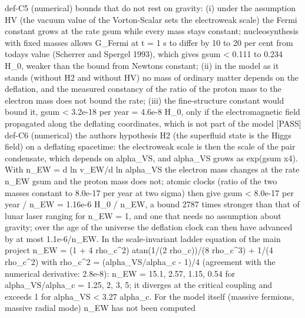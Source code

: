 \documentclass[
  10pt,
]{article}
\newenvironment{Shaded}{}{}
\newcommand{\NormalTok}[1]{#1}
\begin{document}
\begin{Shaded}
\begin{Highlighting}[]
\NormalTok{[PASS] def{-}C5  (numerical) bounds that do not rest on gravity: (i) under the assumption HV (the vacuum value of the Vorton{-}Scalar sets the electroweak scale) the Fermi constant grows at the rate gsum while every mass stays constant; nucleosynthesis with fixed masses allows G\_Fermi at t = 1 s to differ by 10 to 20 per cent from today\textquotesingle{}s value (Scherrer and Spergel 1993), which gives gsum \textless{} 0.111 to 0.234 H\_0, weaker than the bound from Newton\textquotesingle{}s constant; (ii) in the model as it stands (without H2 and without HV) no mass of ordinary matter depends on the deflation, and the measured constancy of the ratio of the proton mass to the electron mass does not bound the rate; (iii) the fine{-}structure constant would bound it, gsum \textless{} 3.2e{-}18 per year = 4.6e{-}8 H\_0, only if the electromagnetic field propagated along the deflating coordinates, which is not part of the model}
\NormalTok{[PASS] def{-}C6  (numerical) the author\textquotesingle{}s hypothesis H2 (the superfluid state is the Higgs field) on a deflating spacetime: the electroweak scale is then the scale of the pair condensate, which depends on alpha\_VS, and alpha\_VS grows as exp(gsum x4). With n\_EW = d ln v\_EW/d ln alpha\_VS the electron mass changes at the rate n\_EW gsum and the proton mass does not; atomic clocks (ratio of the two masses constant to 8.0e{-}17 per year at two sigma) then give gsum \textless{} 8.0e{-}17 per year / n\_EW = 1.16e{-}6 H\_0 / n\_EW, a bound 2787 times stronger than that of lunar laser ranging for n\_EW = 1, and one that needs no assumption about gravity; over the age of the universe the deflation clock can then have advanced by at most 1.1e{-}6/n\_EW. In the scale{-}invariant ladder equation of the main project n\_EW = (1 + 4 rho\_c\^{}2) atan(1/(2 rho\_c))/(8 rho\_c\^{}3) + 1/(4 rho\_c\^{}2) with rho\_c\^{}2 = (alpha\_VS/alpha\_c {-} 1)/4 (agreement with the numerical derivative: 2.8e{-}8): n\_EW = 15.1, 2.57, 1.15, 0.54 for alpha\_VS/alpha\_c = 1.25, 2, 3, 5; it diverges at the critical coupling and exceeds 1 for alpha\_VS \textless{} 3.27 alpha\_c. For the model itself (massive fermions, massive radial mode) n\_EW has not been computed}

\end{Highlighting}
\end{Shaded}
\end{document}
